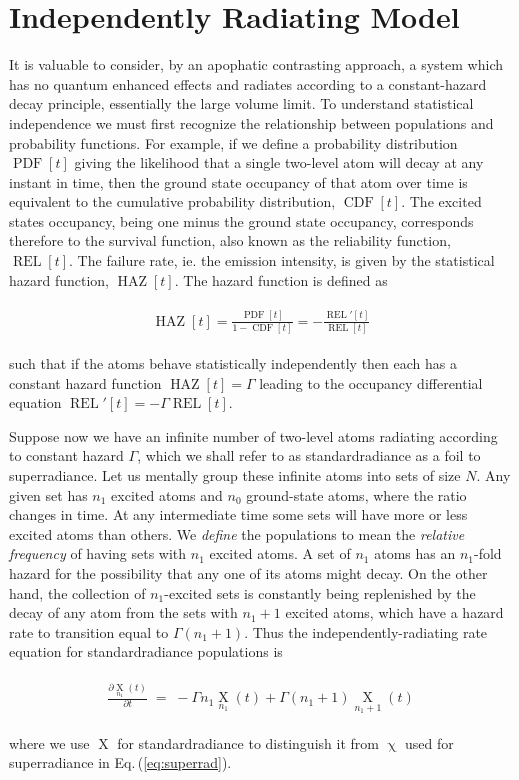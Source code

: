 \documentclass[
  12pt          %
  ,letterpaper  %
  ,center       %
  ,noupper      %
  ,english,fleqn]{uconnthesis}
\let\stdsection\section
\renewcommand\section{\newpage\stdsection}
\newcommand{\LeftEqns}[1]{\begin{fleqn}[\leftmargini minus \leftmargini]\begin{align}#1\end{align}\end{fleqn}}
\newcommand{\LeftEqn}[1]{\LeftEqns{\begin{split}#1\end{split}}}
\newcommand{\ceq}[1]{Eq.\,(\ref{#1})}
\newcommand{\ox}[2]{{\operatorname{X}\limits_{#2}^{}}}
\begin{document}
\section{Independently Radiating Model}

It is valuable to consider, by an apophatic contrasting approach, a system which has no quantum enhanced effects and radiates according to a constant-hazard decay principle, essentially the large volume limit. To understand statistical independence we must first recognize the relationship between populations and probability functions. For example, if we define a probability distribution $\operatorname{PDF}[t]$ giving the likelihood that a single two-level atom will decay at any instant in time, then the ground state occupancy of that atom over time is equivalent to the cumulative probability distribution, $\operatorname{CDF}[t]$. The excited states occupancy, being one minus the ground state occupancy, corresponds therefore to the survival function, also known as the reliability function, $\operatorname{REL}[t]$. The failure rate, ie. the emission intensity, is given by the statistical hazard function, $\operatorname{HAZ}[t]$. The hazard function is defined as 
\LeftEqn{
\operatorname{HAZ}[t]=\frac{\operatorname{PDF}[t]}{1-\operatorname{CDF}[t]}=-\frac{\operatorname{REL}'[t]}{\operatorname{REL}[t]}
}
such that if the atoms behave statistically independently then each has a constant hazard function $\operatorname{HAZ}[t]=\Gamma$ leading to the occupancy differential equation $\operatorname{REL}'[t]=-\Gamma \operatorname{REL}[t]$. 

Suppose now we have an infinite number of two-level atoms radiating according to constant hazard $\Gamma$, which we shall refer to as standardradiance as a foil to superradiance. Let us mentally group these infinite atoms into sets of size $N$. Any given set has $n_1$ excited atoms and $n_0$ ground-state atoms, where the ratio changes in time. At any intermediate time some sets will have more or less excited atoms than others. We {\em define} the populations to mean the {\em relative frequency} of having sets with $n_1$ excited atoms. A set of $n_1$ atoms has an $n_1$-fold hazard for the possibility that any one of its atoms might decay. On the other hand, the collection of $n_1$-excited sets is constantly being replenished by the decay of any atom from the sets with $n_1+1$ excited atoms, which have a hazard rate to transition equal to $\Gamma(n_1+1)$. Thus the independently-radiating rate equation for standardradiance populations is
\LeftEqn{\label{eq:standardrad}
    \frac{\partial \ox{n_0}{n_1}\left(t\right)}{\partial t}\;=\;-\Gamma n_1 \ox{n_0}{n_1}\left(t\right)+\Gamma\left(n_1+1\right)\ox{n_0-1}{n_1+1}\left(t\right)
}
where we use $\operatorname{X}$ for standardradiance to distinguish it from $\operatorname{\chi}$ used for superradiance in \ceq{eq:superrad}. 
\end{document}
